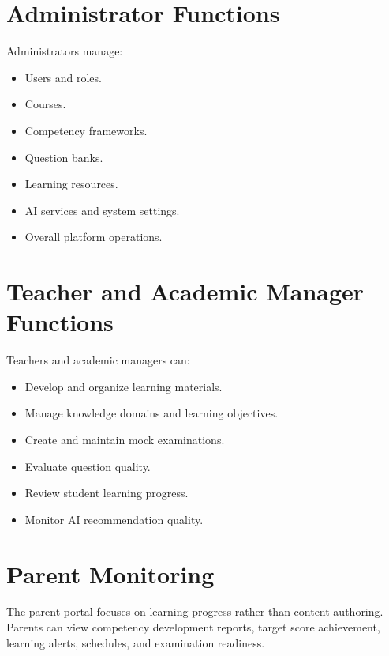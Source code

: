 \documentclass[12pt,a4paper]{report}
\begin{document}
\section{Administrator Functions}

Administrators manage:

\begin{itemize}
	\item Users and roles.
	\item Courses.
	\item Competency frameworks.
	\item Question banks.
	\item Learning resources.
	\item AI services and system settings.
	\item Overall platform operations.
\end{itemize}


\section{Teacher and Academic Manager Functions}

Teachers and academic managers can:

\begin{itemize}
	\item Develop and organize learning materials.
	\item Manage knowledge domains and learning objectives.
	\item Create and maintain mock examinations.
	\item Evaluate question quality.
	\item Review student learning progress.
	\item Monitor AI recommendation quality.
\end{itemize}

\section{Parent Monitoring}

The parent portal focuses on learning progress rather than content authoring. Parents can view competency development reports, target score achievement, learning alerts, schedules, and examination readiness.

\end{document}
